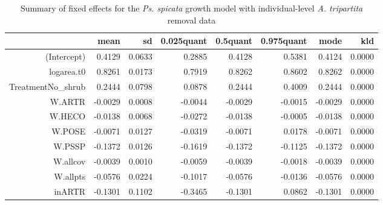 \documentclass[11pt]{article}
\begin{document}
\begin{table}
\centering
\caption{Summary of fixed effects for the \textit{Ps. spicata} growth model with individual-level \textit{A. tripartita} removal data} 
\label{table:PSSPgrowth-inARTR}
\begin{tabular}{rrrrrrrr}
  \hline
 & mean & sd & 0.025quant & 0.5quant & 0.975quant & mode & kld \\ 
  \hline
(Intercept) & 0.4129 & 0.0633 & 0.2885 & 0.4128 & 0.5381 & 0.4124 & 0.0000 \\ 
  logarea.t0 & 0.8261 & 0.0173 & 0.7919 & 0.8262 & 0.8602 & 0.8262 & 0.0000 \\ 
  TreatmentNo\_shrub & 0.2444 & 0.0798 & 0.0878 & 0.2444 & 0.4009 & 0.2444 & 0.0000 \\ 
  W.ARTR & -0.0029 & 0.0008 & -0.0044 & -0.0029 & -0.0015 & -0.0029 & 0.0000 \\ 
  W.HECO & -0.0138 & 0.0068 & -0.0272 & -0.0138 & -0.0005 & -0.0138 & 0.0000 \\ 
  W.POSE & -0.0071 & 0.0127 & -0.0319 & -0.0071 & 0.0178 & -0.0071 & 0.0000 \\ 
  W.PSSP & -0.1372 & 0.0126 & -0.1619 & -0.1372 & -0.1125 & -0.1372 & 0.0000 \\ 
  W.allcov & -0.0039 & 0.0010 & -0.0059 & -0.0039 & -0.0018 & -0.0039 & 0.0000 \\ 
  W.allpts & -0.0576 & 0.0224 & -0.1017 & -0.0576 & -0.0136 & -0.0576 & 0.0000 \\ 
  inARTR & -0.1301 & 0.1102 & -0.3465 & -0.1301 & 0.0862 & -0.1301 & 0.0000 \\ 
   \hline
\end{tabular}
\end{table}
\end{document}
